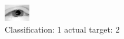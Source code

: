 \begin{figure}[h!]
\begin{center}
\includegraphics[width=0.60\columnwidth]{figures/ID2238_class_1_target_2.png}
\end{center}
\caption{ Classification: 1 actual target: 2}
\label{fig:ID2238_class_1_target_2}
\end{figure}
